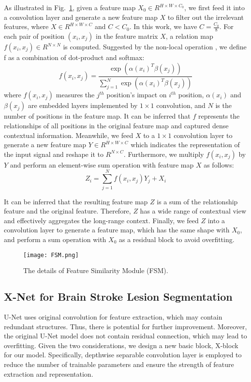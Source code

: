 \documentclass[runningheads]{llncs}
\begin{document}
As illustrated in Fig.~\ref{FSM}, given a feature map $X_0 \in R^{H\times W\times C_0}$, we first feed it into a convolution layer and generate a new feature map $X$ to filter out the irrelevant features, where $X \in R^{H\times W\times C}$ and $C < C_0$. In this work, we have $C = \frac{C_0}{8}$. For each pair of position $(x_i,x_j)$ in the feature matrix $X$, a relation map $f(x_i,x_j)\in R^{N\times N}$ is computed. Suggested by the non-local operation \cite{[15],[19]}, we define f as a combination of dot-product and softmax:
$$
f(x_i,x_j) = \frac {\exp \left( \alpha(x_i)^T \beta(x_j) \right)} {\sum\limits_{j=1}^N \exp \left( \alpha(x_i)^T \beta(x_j) \right)}
$$
where $f(x_i, x_j)$ measures the $j^{th}$ position’s impact on $i^{th}$ position, $\alpha(x_i)$ and $\beta(x_j)$ are embedded layers implemented by $1\times 1$ convolution, and $N$ is the number of positions in the feature map. It can be inferred that $f$ represents the relationships of all positions in the original feature map and captured dense contextual information. Meanwhile, we feed $X$ to a $1\times 1$ convolution layer to generate a new feature map $Y \in R^{H\times W\times C}$ which indicates the representation of the input signal and reshape it to $R^{N\times C}$. Furthermore, we multiply $f(x_i, x_j)$ by $Y$ and perform an element-wise sum operation with feature map $X$ as follows:
$$
Z_i = \sum\limits_{j=1}^N f(x_i, x_j)Y_j + X_i
$$

It can be inferred that the resulting feature map $Z$ is a sum of the relationship feature and the original feature. Therefore, $Z$ has a wide range of contextual view and effectively aggregates the long-range context. Finally, we feed $Z$ into a convolution layer to generate a feature map, which has the same shape with $X_0$, and perform a sum operation with $X_0$ as a residual block to avoid overfitting. 

\begin{figure}
	\texttt{[image: FSM.png]}
	\caption{The details of Feature Similarity Module (FSM).} \label{FSM}
\end{figure}

\subsection{X-Net for Brain Stroke Lesion Segmentation}
U-Net \cite{[5]} uses original convolution for feature extraction, which may contain redundant structures. Thus, there is potential for further improvement. Moreover, the original U-Net model does not contain residual connection, which may lead to overfitting. Given the two considerations, we design a new basic block, X-block for our model. Specifically, depthwise separable convolution layer is employed to reduce the number of trainable parameters and ensure the strength of feature extraction and representation.
\end{document}
